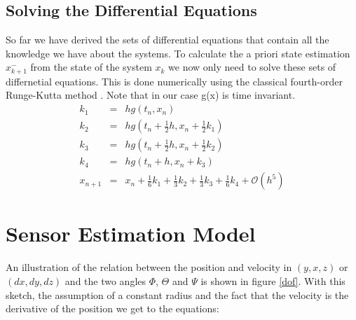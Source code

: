 \subsection*{Solving the Differential Equations}
So far we have derived the sets of differential equations that contain all the knowledge we have about the systems. To calculate the a priori state estimation $x^{-}_{k+1}$ from the state of the system $x_{k}$ we now only need to solve these sets of differnetial equations. This is done numerically using the classical fourth-order Runge-Kutta method \cite{Kutta1901}. Note that in our case g(x) is time invariant. 
\begin{eqnarray}k_{1}&=&h g(t_{n},x_{n})\\
k_{2}&=&h g(t_{n}+\frac{1}{2}h,x_{n}+\frac{1}{2}k_{1})\\
k_{3}&=&h g(t_{n}+\frac{1}{2}h,x_{n}+\frac{1}{2}k_{2})\\
k_{4}&=&h g(t_{n}+h,x_{n}+k_{3})\\
x_{n+1}&=&x_{n} + \frac{1}{6} k_{1} + \frac{1}{3} k_{2} + \frac{1}{3} k_{3} + \frac{1}{6} k_{4} + \mathcal{O}(h^{5})\end{eqnarray}

\section{Sensor Estimation Model}\label{sensor_estimation}
An illustration of the relation between the position and velocity in $(y,x,z)$ or $(dx,dy,dz)$ and the two angles $\Phi$, $\Theta$ and $\Psi$  is shown in figure \ref{dof}. With this sketch, the assumption of a constant radius and the fact that the velocity is the derivative of the position we get to the equations: 

